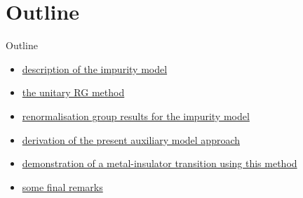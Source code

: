 \documentclass[aspectratio=169]{beamer}
\begin{document}
\section{Outline}
\begin{frame}[noframenumbering]{Outline}
\begin{itemize}
	\item \hyperref[the-model]{description of the impurity model}
	\item \hyperref[method]{the unitary RG method}
	\item \hyperref[urg-1]{renormalisation group results for the impurity model}
	\item \hyperref[aux-method]{derivation of the present auxiliary model approach}
	\item \hyperref[mit]{demonstration of a metal-insulator transition using this method}
	\item \hyperref[concl]{some final remarks}
\end{itemize}
\end{frame}
\end{document}

